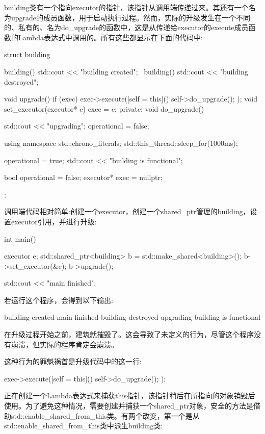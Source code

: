 building类有一个指向executor的指针，该指针从调用端传递过来。其还有一个名为upgrade的成员函数，用于启动执行过程。然而，实际的升级发生在一个不同的、私有的、名为do\_upgrade的函数中，这是从传递给executor的execute成员函数的Lambda表达式中调用的。所有这些都显示在下面的代码中:

\begin{cpp}
struct building
{
	building() { std::cout << "building created\n"; }
	~building() { std::cout << "building destroyed\n"; }
	
	void upgrade()
	{
		if (exec)
		{
			exec->execute([self = this]() {
				self->do_upgrade();
			});
		}
	}
	void set_executor(executor* e) { exec = e; }
private:
	void do_upgrade()
	{
		std::cout << "upgrading\n";
		operational = false;
		
		using namespace std::chrono_literals;
		std::this_thread::sleep_for(1000ms);
		
		operational = true;
		std::cout << "building is functional\n";
	}

	bool operational = false;
	executor* exec = nullptr;
};
\end{cpp}

调用端代码相对简单:创建一个executor，创建一个shared\_ptr管理的building，设置executor引用，并进行升级:

\begin{cpp}
int main()
{
	executor e;
	std::shared_ptr<building> b =
		std::make_shared<building>();
	b->set_executor(&e);
	b->upgrade();
	
	std::cout << "main finished\n";
}
\end{cpp}

若运行这个程序，会得到以下输出:

\begin{shell}
building created
main finished
building destroyed
upgrading
building is functional
\end{shell}

在升级过程开始之前，建筑就摧毁了。这会导致了未定义的行为，尽管这个程序没有崩溃，但实际的程序肯定会崩溃。

这种行为的罪魁祸首是升级代码中的这一行:

\begin{cpp}
exec->execute([self = this]() {
	self->do_upgrade();
});
\end{cpp}

正在创建一个Lambda表达式来捕获this指针，该指针稍后在所指向的对象销毁后使用。为了避免这种情况，需要创建并捕获一个shared\_ptr对象，安全的方法是借助std::enable\_shared\_from\_this类。有两个改变，第一个是从std::enable\_shared\_from\_this类中派生building类:

